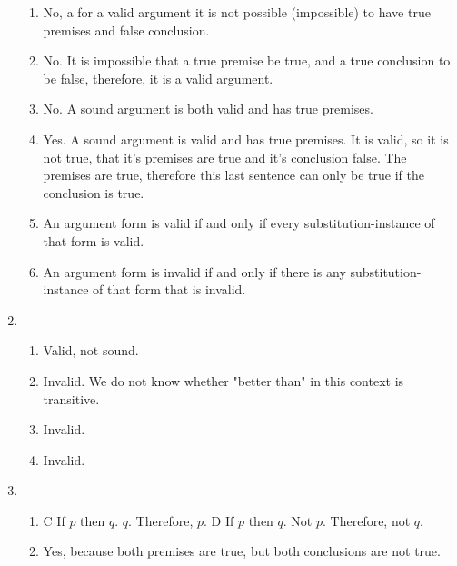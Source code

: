 \documentclass[a4paper,12pt]{article}
\begin{document}
\begin{enumerate}[label=\arabic*,leftmargin=*]
\begin{enumerate}[label=\Alph*]
                \item No, a for a valid argument it is not possible (impossible) to have true premises and false conclusion.

                \item No. It is impossible that a true premise be true, and a true conclusion to be false, therefore, it is a valid argument.

                \item No. A sound argument is both valid and has true premises.

                \item Yes. A sound argument is valid and has true premises. It is valid, so it is not true, that it's premises are true and it's conclusion false. The premises are true, therefore this last sentence can only be true if the conclusion is true.

                \item An argument form is valid if and only if every substitution-instance of that form is valid.

                \item An argument form is invalid if and only if there is any substitution-instance of that form that is invalid.

            \end{enumerate}

        \item
            \nopagebreak
            \begin{enumerate}[label=\Alph*]
                \item Valid, not sound.
                \item Invalid. We do not know whether "better than" in this context is transitive.
                \item Invalid.
                \item Invalid.
            \end{enumerate}

        \item
            \nopagebreak
            \begin{enumerate}[label=(\roman*)]
                \item C If $p$ then $q$. $q$. Therefore, $p$.
                    D If $p$ then $q$. Not $p$. Therefore, not $q$.
                \item Yes, because both premises are true, but both conclusions are not true.
            \end{enumerate}


\end{enumerate}
\end{document}
